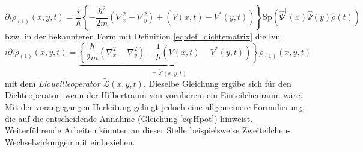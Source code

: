 \begin{equation*}
  \partial_t \rho_{(1)}(x,y,t) = \frac{i}{\hbar}\left\{-\frac{\hbar^2}{2m}(\nabla_x^2 - \nabla_y^2) + (V(x,t) - V^*(y,t)) \right\}
                          \text{Sp}(\hat{\Psi}^{\dagger}(x) \hat{\Psi}(y) \hat{\rho}(t))
\end{equation*}
bzw. in der bekannteren Form mit Definition \eqref{eq:def_dichtematrix} die \ac{lvn}
\begin{equation}
  i\partial_t \rho_{(1)}(x,y,t) = \underbrace{\left\{\frac{\hbar}{2m}(\nabla_x^2 - \nabla_y^2) - \frac{1}{\hbar}(V(x,t) - V^*(y,t)) \right\}}_{\equiv{\tilde{\mathcal{L}}(x,y,t)}} \rho_{(1)}(x,y,t)
  \label{eq:lvn_first}
\end{equation}
mit dem \emph{Liouvilleoperator} $\tilde{\mathcal{L}}(x,y,t)$. Dieselbe Gleichung ergäbe sich für den Dichteoperator, wenn der Hilbertraum von vornherein ein Einteilchenraum wäre. Mit der vorangegangen Herleitung gelingt jedoch eine allgemeinere Formulierung, die auf die entscheidende Annahme (Gleichung \eqref{eq:Hpot}) hinweist. Weiterführende Arbeiten könnten an dieser Stelle beispielsweise Zweiteilchen-Wechselwirkungen mit einbeziehen.

